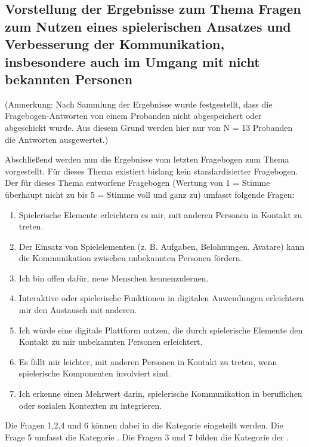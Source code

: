 \subsection{Vorstellung der Ergebnisse zum Thema Fragen zum Nutzen eines spielerischen Ansatzes und Verbesserung der Kommunikation, insbesondere auch im Umgang mit nicht bekannten Personen}
(Anmerkung: Nach Sammlung der Ergebnisse wurde festgestellt, dass die Fragebogen-Antworten von einem Probanden nicht abgespeichert oder abgeschickt wurde. Aus diesem Grund werden hier nur von N = 13 Probanden die Antworten ausgewertet.)

Abschließend werden nun die Ergebnisse vom letzten Fragebogen zum Thema  vorgestellt. Für dieses Thema existiert bislang kein standardisierter Fragebogen. Der für dieses Thema entworfene Fragebogen (Wertung von 1 = Stimme überhaupt nicht zu bis 5 = Stimme voll und ganz zu) umfasst folgende Fragen:
\begin{enumerate}
    \item Spielerische Elemente erleichtern es mir, mit anderen Personen in Kontakt zu treten.
    \item Der Einsatz von Spielelementen (z. B. Aufgaben, Belohnungen, Avatare) kann die Kommunikation zwischen unbekannten Personen fördern.
    \item Ich bin offen dafür, neue Menschen kennenzulernen.
    \item Interaktive oder spielerische Funktionen in digitalen Anwendungen erleichtern mir den Austausch mit anderen.
    \item Ich würde eine digitale Plattform nutzen, die durch spielerische Elemente den Kontakt zu mir unbekannten Personen erleichtert.
    \item Es fällt mir leichter, mit anderen Personen in Kontakt zu treten, wenn spielerische Komponenten involviert sind.
    \item Ich erkenne einen Mehrwert darin, spielerische Kommunikation in beruflichen oder sozialen Kontexten zu integrieren.
\end{enumerate}

Die Fragen 1,2,4 und 6 können dabei in die Kategorie  eingeteilt werden. Die Frage 5 umfasst die Kategorie . Die Fragen 3 und 7 bilden die Kategorie der .

